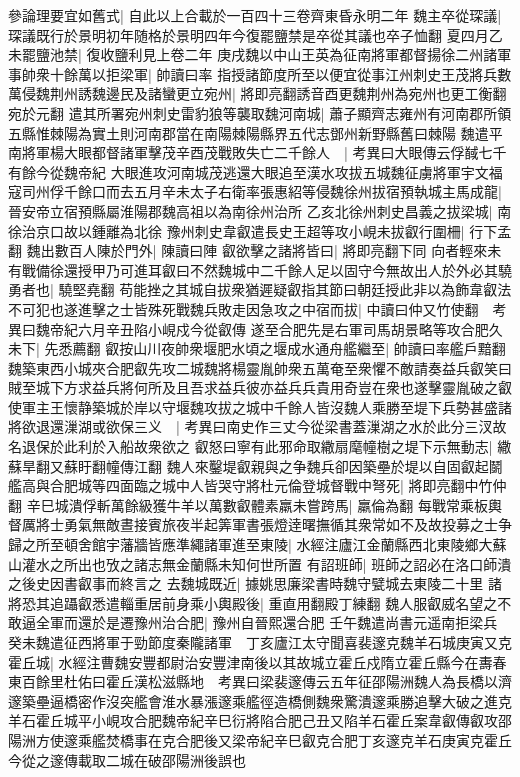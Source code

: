 參論理要宜如舊式|{
	自此以上合載於一百四十三卷齊東昏永明二年}
魏主卒從琛議|{
	琛議既行於景明初年随格於景明四年今復罷鹽禁是卒從其議也卒子恤翻}
夏四月乙未罷鹽池禁|{
	復收鹽利見上卷二年}
庚戌魏以中山王英為征南將軍都督揚徐二州諸軍事帥衆十餘萬以拒梁軍|{
	帥讀曰率}
指授諸節度所至以便宜從事江州刺史王茂將兵數萬侵魏荆州誘魏邊民及諸蠻更立宛州|{
	將即亮翻誘音酉更魏荆州為宛州也更工衡翻宛於元翻}
遣其所署宛州刺史雷豹狼等襲取魏河南城|{
	蕭子顯齊志雍州有河南郡所領五縣惟棘陽為實土則河南郡當在南陽棘陽縣界五代志鄧州新野縣舊曰棘陽}
魏遣平南將軍楊大眼都督諸軍擊茂辛酉茂戰敗失亡二千餘人　|{
	考異曰大眼傳云俘馘七千有餘今從魏帝紀}
大眼進攻河南城茂逃還大眼追至漢水攻拔五城魏征虜將軍宇文福寇司州俘千餘口而去五月辛未太子右衛率張惠紹等侵魏徐州拔宿預執城主馬成龍|{
	晉安帝立宿預縣屬淮陽郡魏高祖以為南徐州治所}
乙亥北徐州刺史昌義之拔梁城|{
	南徐治京口故以鍾離為北徐}
豫州刺史韋叡遣長史王超等攻小峴未拔叡行圍柵|{
	行下孟翻}
魏出數百人陳於門外|{
	陳讀曰陣}
叡欲擊之諸將皆曰|{
	將即亮翻下同}
向者輕來未有戰備徐還授甲乃可進耳叡曰不然魏城中二千餘人足以固守今無故出人於外必其驍勇者也|{
	驍堅堯翻}
苟能挫之其城自拔衆猶遲疑叡指其節曰朝廷授此非以為飾韋叡法不可犯也遂進擊之士皆殊死戰魏兵敗走因急攻之中宿而拔|{
	中讀曰仲又竹使翻　考異曰魏帝紀六月辛丑陷小峴戍今從叡傳}
遂至合肥先是右軍司馬胡景略等攻合肥久未下|{
	先悉薦翻}
叡按山川夜帥衆堰肥水頃之堰成水通舟艦繼至|{
	帥讀曰率艦戶黯翻}
魏築東西小城夾合肥叡先攻二城魏將楊靈胤帥衆五萬奄至衆懼不敵請奏益兵叡笑曰賊至城下方求益兵將何所及且吾求益兵彼亦益兵兵貴用奇豈在衆也遂擊靈胤破之叡使軍主王懷静築城於岸以守堰魏攻拔之城中千餘人皆沒魏人乘勝至堤下兵勢甚盛諸將欲退還漅湖或欲保三义　|{
	考異曰南史作三丈今從梁書蓋漅湖之水於此分三汊故名退保於此利於入船故衆欲之}
叡怒曰寧有此邪命取繖扇麾幢樹之堤下示無動志|{
	繖蘇旱翻又蘇盱翻幢傳江翻}
魏人來鑿堤叡親與之争魏兵卻因築壘於堤以自固叡起鬬艦高與合肥城等四面臨之城中人皆哭守將杜元倫登城督戰中弩死|{
	將即亮翻中竹仲翻}
辛巳城潰俘斬萬餘級獲牛羊以萬數叡體素羸未嘗跨馬|{
	羸倫為翻}
每戰常乘板輿督厲將士勇氣無敵晝接賓旅夜半起筭軍書張燈逹曙撫循其衆常如不及故投募之士争歸之所至頓舍館宇藩牆皆應準繩諸軍進至東陵|{
	水經注廬江金蘭縣西北東陵鄉大蘇山灌水之所出也攷之諸志無金蘭縣未知何世所置}
有詔班師|{
	班師之詔必在洛口師潰之後史因書叡事而終言之}
去魏城既近|{
	據姚思廉梁書時魏守甓城去東陵二十里}
諸將恐其追躡叡悉遣輜重居前身乘小輿殿後|{
	重直用翻殿丁練翻}
魏人服叡威名望之不敢逼全軍而還於是遷豫州治合肥|{
	豫州自晉熙還合肥}
壬午魏遣尚書元遥南拒梁兵　癸未魏遣征西將軍于勁節度秦隴諸軍　丁亥廬江太守聞喜裴邃克魏羊石城庚寅又克霍丘城|{
	水經注曹魏安豐都尉治安豐津南後以其故城立霍丘戍隋立霍丘縣今在夀春東百餘里杜佑曰霍丘漢松滋縣地　考異曰梁裴邃傳云五年征邵陽洲魏人為長橋以濟邃築壘逼橋密作沒突艦會淮水暴漲邃乘艦徑造橋側魏衆驚潰邃乘勝追擊大破之進克羊石霍丘城平小峴攻合肥魏帝紀辛巳衍將陷合肥己丑又陷羊石霍丘案韋叡傳叡攻邵陽洲方使邃乘艦焚橋事在克合肥後又梁帝紀辛巳叡克合肥丁亥邃克羊石庚寅克霍丘今從之邃傳載取二城在破邵陽洲後誤也}

